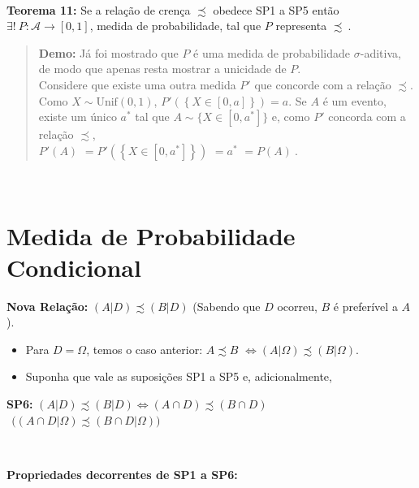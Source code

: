\documentclass[
]{book}
\begin{document}
\(~\)

\textbf{Teorema 11:} Se a relação de crença \(\precsim\) obedece SP1 a SP5 então \(\exists !~ P: \mathcal{A} \rightarrow [0,1]\), medida de probabilidade, tal que \(P\) representa \(\precsim~.\)

\begin{quote}
\textbf{Demo:}
Já foi mostrado que \(P\) é uma medida de probabilidade \(\sigma\)-aditiva, de modo que apenas resta mostrar a unicidade de \(P\).\\
Considere que existe uma outra medida \(P'\) que concorde com a relação \(\precsim\). Como \(X\sim\text{Unif}(0,1)\), \(P'\left(\left\{X\in[0,a]\right\}\right)=a\). Se \(A\) é um evento, existe um único \(a^*\) tal que \(A\sim\{X\in[0,a^*]\}\) e, como \(P'\) concorda com a relação \(\precsim\),\\
\(P'(A)\) \(=P'\left(\left\{X\in[0,a^*]\right\}\right)\) \(=a^*\) \(=P(A)~.\)
\end{quote}

\(~\)

\hypertarget{medida-de-probabilidade-condicional}{%
\section{Medida de Probabilidade Condicional}\label{medida-de-probabilidade-condicional}}

\textbf{Nova Relação:} \((A|D) \precsim (B|D)\) (Sabendo que \(D\) ocorreu, \(B\) é preferível a \(A\)).

\begin{itemize}
\item
  Para \(D = \Omega\), temos o caso anterior: \(A \precsim B\) \(\Leftrightarrow (A|\Omega) \precsim (B|\Omega)\).
\item
  Suponha que vale as suposições SP1 a SP5 e, adicionalmente,
\end{itemize}

\textbf{SP6:} \((A|D) \precsim (B|D) \Leftrightarrow (A \cap D) \precsim (B \cap D)\) \(~~\Big( (A \cap D|\Omega) \precsim (B \cap D|\Omega) \Big)\)

\(~\)

\textbf{Propriedades decorrentes de SP1 a SP6:}
\end{document}
